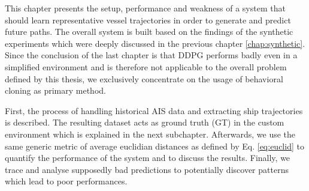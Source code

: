 This chapter presents the setup, performance and weakness of a system that should learn representative vessel trajectories in order to generate and predict future paths. The overall system is built based on the findings of the synthetic experiments which were deeply discussed in the previous chapter \ref{chap:synthetic}. Since the conclusion of the last chapter is that DDPG performs badly even in a simplified environment and is therefore not applicable to the overall problem defined by this thesis, we exclusively concentrate on the usage of behavioral cloning as primary method. 
\par
First, the process of handling historical AIS data and extracting ship trajectories is described. The resulting dataset acts as ground truth (GT) in the custom environment which is explained in the next subchapter. Afterwards, we use the same generic metric of average euclidian distances as defined by Eq. \ref{eq:euclid} to quantify the performance of the system and to discuss the results. Finally, we trace and analyse supposedly bad predictions to potentially discover patterns which lead to poor performances.